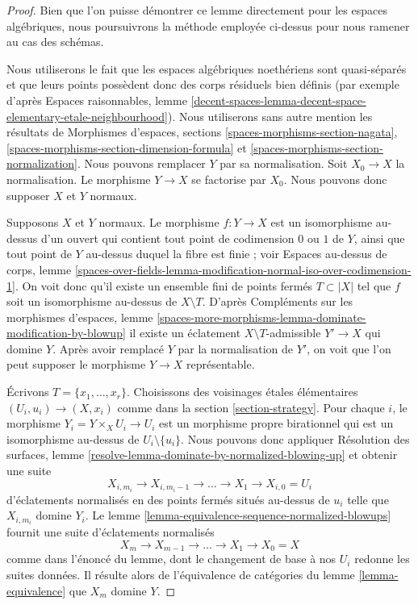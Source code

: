 \begin{proof}
Bien que l'on puisse démontrer ce lemme directement pour les espaces
algébriques, nous poursuivrons la méthode employée ci-dessus pour nous ramener
au cas des schémas.

\medskip\noindent
Nous utiliserons le fait que les espaces algébriques noethériens sont
quasi-séparés et que leurs points possèdent donc des corps résiduels bien
définis (par exemple d'après Espaces raisonnables, lemme
\ref{decent-spaces-lemma-decent-space-elementary-etale-neighbourhood}).
Nous utiliserons sans autre mention les résultats de Morphismes d'espaces,
sections
\ref{spaces-morphisms-section-nagata},
\ref{spaces-morphisms-section-dimension-formula} et
\ref{spaces-morphisms-section-normalization}.
Nous pouvons remplacer $Y$ par sa normalisation. Soit $X_0 \to X$ la
normalisation. Le morphisme $Y \to X$ se factorise par $X_0$.
Nous pouvons donc supposer $X$ et $Y$ normaux.

\medskip\noindent
Supposons $X$ et $Y$ normaux. Le morphisme $f : Y \to X$ est un isomorphisme
au-dessus d'un ouvert qui contient tout point de codimension $0$ ou $1$ de
$Y$, ainsi que tout point de $Y$ au-dessus duquel la fibre est finie ; voir
Espaces au-dessus de corps, lemme
\ref{spaces-over-fields-lemma-modification-normal-iso-over-codimension-1}.
On voit donc qu'il existe un ensemble fini de points fermés $T \subset |X|$
tel que $f$ soit un isomorphisme au-dessus de $X \setminus T$.
D'après Compléments sur les morphismes d'espaces, lemme
\ref{spaces-more-morphisms-lemma-dominate-modification-by-blowup}
il existe un éclatement $X \setminus T$-admissible $Y' \to X$ qui domine $Y$.
Après avoir remplacé $Y$ par la normalisation de $Y'$, on voit que l'on peut
supposer le morphisme $Y \to X$ représentable.

\medskip\noindent
Écrivons $T = \{x_1, \ldots, x_r\}$. Choisissons des voisinages étales
élémentaires $(U_i, u_i) \to (X, x_i)$ comme dans la section
\ref{section-strategy}. Pour chaque $i$, le morphisme
$Y_i = Y \times_X U_i \to U_i$ est un morphisme propre birationnel qui est un
isomorphisme au-dessus de $U_i \setminus \{u_i\}$. Nous pouvons donc appliquer
Résolution des surfaces, lemme
\ref{resolve-lemma-dominate-by-normalized-blowing-up}
et obtenir une suite
$$
X_{i, m_i} \to X_{i, m_i - 1} \to \ldots \to X_1 \to X_{i, 0} = U_i
$$
d'éclatements normalisés en des points fermés situés au-dessus de $u_i$ telle
que $X_{i, m_i}$ domine $Y_i$.
Le lemme \ref{lemma-equivalence-sequence-normalized-blowups} fournit une suite
d'éclatements normalisés
$$
X_m \to X_{m - 1} \to \ldots \to X_1 \to X_0 = X
$$
comme dans l'énoncé du lemme, dont le changement de base à nos $U_i$ redonne
les suites données. Il résulte alors de l'équivalence de catégories du lemme
\ref{lemma-equivalence} que $X_m$ domine $Y$.
\end{proof}















